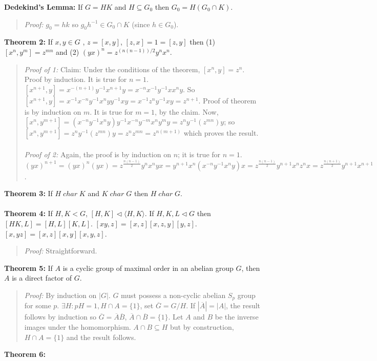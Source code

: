 {\bf Dedekind's Lemma:}  If $G=HK$ and $H \subseteq G_0$ then $G_0 = H(G_0 \cap K)$.
\begin{quote}
\emph {Proof:}
$g_0=hk$ so $g_0 h^{-1} \in G_0 \cap K$ (since $h \in G_0$).
\end{quote}
{\bf Theorem 2:}  If $x,y \in G$ , $z=[x,y]$, $[z, x]=1=[z,y]$ then (1) $[x^n, y^m]=z^{mn}$ and
(2) $(yx)^n= z^{(n(n-1))/2}y^n x^n$.
\begin{quote}
\emph {Proof of 1:} Claim: Under the conditions of the theorem, $[x^n,y]= z^n$.  Proof by induction.
It is true for $n=1$.  $[x^{n+1},y]= x^{-(n+1)}y^{-1}x^{n+1}y= x^{-n}x^{-1} y^{-1} x x^n y$.
So $[x^{n+1},y]= x^{-1} x^{-n} y^{-1} x^n y y^{-1} x y= x^{-1} z^n y^{-1} x y= z^{n+1}$.
Proof of theorem is by induction on $m$.  It is true for $m=1$, by the claim.  Now,
$[x^n,y^{m+1}]= (x^{-n} y^{-1} x^n y) y^{-1} x^{-n} y^{-m} x^n y^m y= z^n y^{-1} (z^{mn}) y$;
so $[x^n,y^{m+1}]= z^n y^{-1} (z^{mn}) y = z^n z^{mn}= z^{n(m+1)}$ which proves the result.
\\
\\
\emph {Proof of 2:} Again, the proof is by induction on $n$; it is true for $n=1$.
$(yx)^{n+1}= (yx)^n (yx)=
z^{\frac {n(n-1)} {2}} y^n x^n y x= y^{n+1} x^n (x^{-n} y^{-1} x^n y) x
= z^{\frac {n(n-1)} {2}} y^{n+1} x^n z^n x= z^{\frac {n(n+1)} 2} y^{n+1} x^{n+1}$.
\end{quote}
{\bf Theorem 3:}
If  $H \; char \; K$ and $K \;  char \; G$ then $H \; char \; G$.
\\
\\
{\bf Theorem 4:}
If $H, K < G$, $[H,K] \lhd \langle H, K \rangle$.
If $H, K, L \lhd G$ then $[HK,L]= [H,L] [K, L]$.
$[xy,z]= [x,z] [x,z,y] [y,z]$.
$[x, yz]= [x,z] [x,y] [x,y,z]$.
\begin{quote}
\emph{Proof:}
Straightforward.
\end{quote}
{\bf Theorem 5:}
If $A$ is a cyclic group of maximal order in an abelian group $G$, then $A$ is a direct
factor of $G$.
\begin{quote}
\emph{Proof:}  By induction on $|G|$.
$G$ must possess a non-cyclic abelian $S_p$ group for some $p$.
$\exists H: pH=1, H \cap A = \{ 1 \}$, set ${\overline G}= G/H$.
If $|{\overline A}|= |A|$, the result follows by induction so
${\overline G} = {\overline A} {\overline B}$,
${\overline A} \cap {\overline B} = \{ 1 \}$.  Let $A$ and $B$ be the inverse images
under the homomorphism.  $A \cap B \subseteq H$ but by construction, $H \cap A= \{ 1 \}$
and the result follows.
\end{quote}
{\bf Theorem 6:}
